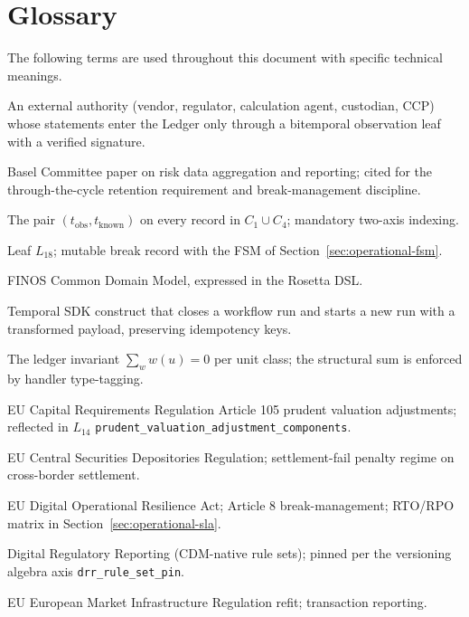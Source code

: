 \documentclass[11pt,a4paper]{article}
\begin{document}
\clearpage
\section{Glossary}
\label{app:glossary}

The following terms are used throughout this document with specific technical meanings.

\begin{description}[style=nextline]
\item[Attestor] An external authority (vendor, regulator, calculation agent, custodian, CCP) whose statements enter the Ledger only through a bitemporal observation leaf with a verified signature.
\item[BCBS 239] Basel Committee paper on risk data aggregation and reporting; cited for the through-the-cycle retention requirement and break-management discipline.
\item[Bitemporal axes] The pair $(t_{\mathrm{obs}}, t_{\mathrm{known}})$ on every record in $C_1 \cup C_4$; mandatory two-axis indexing.
\item[BreakRegister] Leaf $L_{18}$; mutable break record with the FSM of Section~\ref{sec:operational-fsm}.
\item[CDM] FINOS Common Domain Model, expressed in the Rosetta DSL.
\item[ContinueAsNew] Temporal SDK construct that closes a workflow run and starts a new run with a transformed payload, preserving idempotency keys.
\item[Conservation] The ledger invariant $\sum_w w(u) = 0$ per unit class; the structural sum is enforced by handler type-tagging.
\item[CRR Article 105 PVA] EU Capital Requirements Regulation Article 105 prudent valuation adjustments; reflected in $L_{14}$ \texttt{prudent\_valuation\_adjustment\_components}.
\item[CSDR] EU Central Securities Depositories Regulation; settlement-fail penalty regime on cross-border settlement.
\item[DORA] EU Digital Operational Resilience Act; Article 8 break-management; RTO/RPO matrix in Section~\ref{sec:operational-sla}.
\item[DRR] Digital Regulatory Reporting (CDM-native rule sets); pinned per the versioning algebra axis \texttt{drr\_rule\_set\_pin}.
\item[EMIR Refit] EU European Market Infrastructure Regulation refit; transaction reporting.

\end{description}
\end{document}
